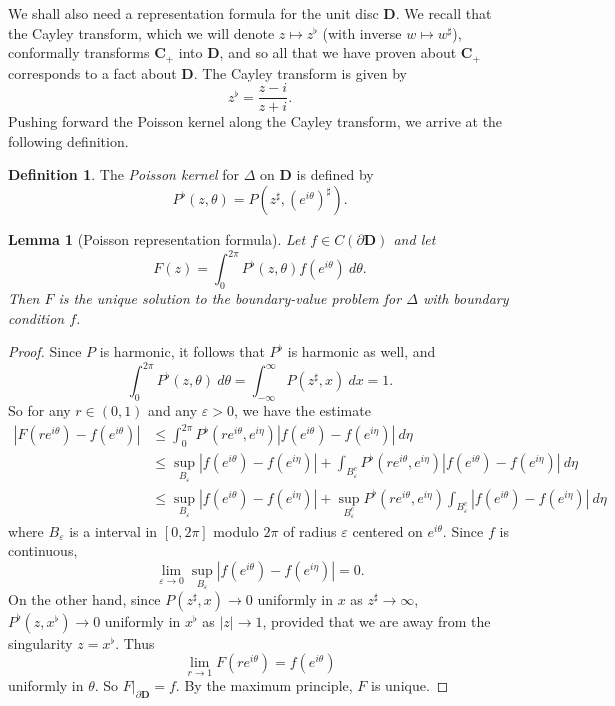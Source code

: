 \documentclass[12pt]{report}
\newcommand{\CC}{\mathbf{C}}
\newcommand{\DD}{\mathbf{D}}
\newcommand{\dfn}[1]{\emph{#1}\index{#1}}
\newtheorem{lemma}[theorem]{Lemma}
\theoremstyle{definition}
\newtheorem{definition}[theorem]{Definition}
\theoremstyle{remark}
\begin{document}
We shall also need a representation formula for the unit disc $\DD$. We recall that the Cayley transform, which we will denote $z \mapsto z^\flat$ (with inverse $w \mapsto w^\sharp$), conformally transforms $\CC_+$ into $\DD$, and so all that we have proven about $\CC_+$ corresponds to a fact about $\DD$. The Cayley transform is given by
$$z^\flat = \frac{z - i}{z + i}.$$
Pushing forward the Poisson kernel along the Cayley transform, we arrive at the following definition.
\begin{definition}
The \dfn{Poisson kernel} for $\Delta$ on $\DD$ is defined by
$$P^\flat(z, \theta) = P(z^\sharp, (e^{i\theta})^\sharp).$$
\end{definition}
\begin{lemma}[Poisson representation formula]
Let $f \in C(\partial \DD)$ and let
$$F(z) = \int_0^{2\pi} P^\flat(z, \theta)f(e^{i\theta}) ~d\theta.$$
Then $F$ is the unique solution to the boundary-value problem for $\Delta$ with boundary condition $f$.
\end{lemma}
\begin{proof}
Since $P$ is harmonic, it follows that $P^\flat$ is harmonic as well, and
$$\int_0^{2\pi} P^\flat(z, \theta) ~d\theta = \int_{-\infty}^\infty P(z^\sharp, x) ~dx = 1.$$
So for any $r \in (0, 1)$ and any $\varepsilon > 0$, we have the estimate
\begin{align*}
  |F(re^{i\theta}) - f(e^{i\theta})| &\leq \int_0^{2\pi} P^\flat(re^{i\theta}, e^{i\eta})|f(e^{i\theta}) - f(e^{i\eta})| ~d\eta\\
    &\leq \sup_{B_\varepsilon} |f(e^{i\theta}) - f(e^{i\eta})| + \int_{B_\varepsilon^c} P^\flat(re^{i\theta}, e^{i\eta})|f(e^{i\theta}) - f(e^{i\eta})| ~d\eta\\
    &\leq \sup_{B_\varepsilon} |f(e^{i\theta}) - f(e^{i\eta})| + \sup_{B_\varepsilon^c} P^\flat(re^{i\theta}, e^{i\eta}) \int_{B_\varepsilon^c} |f(e^{i\theta}) - f(e^{i\eta})| ~d\eta
\end{align*}
where $B_\varepsilon$ is a interval in $[0, 2\pi]$ modulo $2\pi$ of radius $\varepsilon$ centered on $e^{i\theta}$. Since $f$ is continuous,
$$\lim_{\varepsilon \to 0}\sup_{B_\varepsilon} |f(e^{i\theta}) - f(e^{i\eta})| = 0.$$
On the other hand, since $P(z^\sharp, x) \to 0$ uniformly in $x$ as $z^\sharp \to \infty$, $P^\flat(z, x^\flat) \to 0$ uniformly in $x^\flat$ as $|z| \to 1$, provided that we are away from the singularity $z = x^\flat$. Thus
$$\lim_{r \to 1} F(re^{i\theta}) = f(e^{i\theta})$$
uniformly in $\theta$. So $F|_{\partial \DD} = f$. By the maximum principle, $F$ is unique.
\end{proof}
\end{document}
